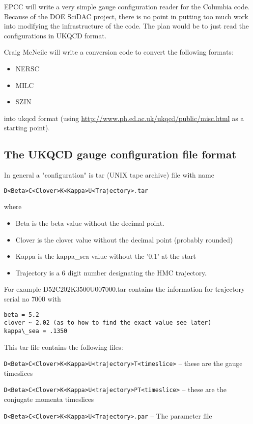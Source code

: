 \documentclass[12pt]{article}
\begin{document}
EPCC will write a very simple gauge configuration
reader for the Columbia code. Because of the DOE SciDAC project, there is no point in putting too much work into modifying the infrastructure of the code. The plan would be to just read the configurations in UKQCD format.

Craig McNeile will write a conversion code to convert the following formats:
\begin{itemize}
    \item NERSC
    \item MILC
    \item SZIN
\end{itemize}
into ukqcd format (using \href{http://www.ph.ed.ac.uk/ukqcd/public/misc.html}{http://www.ph.ed.ac.uk/ukqcd/public/misc.html} as a starting point).

\subsection{The UKQCD gauge configuration file format}
In general a "configuration" is  tar (UNIX tape archive) file with 
name
\begin{verbatim}
D<Beta>C<Clover>K<Kappa>U<Trajectory>.tar
\end{verbatim}
where 
\begin{itemize}
\item Beta is the beta value without the decimal point.
\item Clover is the clover value without the decimal point (probably rounded)
\item Kappa  is the kappa\_sea value without the '0.1' at the start
\item Trajectory is a 6 digit number designating the HMC trajectory.
\end{itemize}
For example D52C202K3500U007000.tar
contains the information for trajectory serial no 7000 with
\begin{verbatim}
beta = 5.2
clover ~ 2.02 (as to how to find the exact value see later)
kappa\_sea = .1350
\end{verbatim}
This tar file contains the following files:

{\tt D<Beta>C<Clover>K<Kappa>U<trajectory>T<timeslice>} -- these are the gauge timeslices

{\tt D<Beta>C<Clover>K<Kappa>U<trajectory>PT<timeslice>} -- these are the conjugate momenta timeslices

{\tt D<Beta>C<Clover>K<Kappa>U<Trajectory>.par} -- The parameter file
\end{document}
